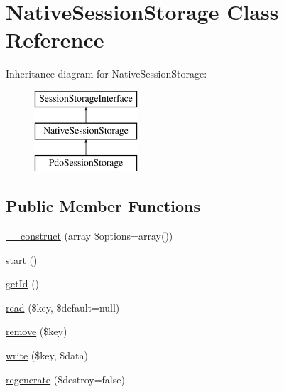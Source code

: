 \hypertarget{class_symfony_1_1_component_1_1_http_foundation_1_1_session_storage_1_1_native_session_storage}{
\section{\-Native\-Session\-Storage \-Class \-Reference}
\label{class_symfony_1_1_component_1_1_http_foundation_1_1_session_storage_1_1_native_session_storage}
}
\-Inheritance diagram for \-Native\-Session\-Storage\-:\begin{figure}[H]
\begin{center}
\leavevmode
\includegraphics[height=3.000000cm]{class_symfony_1_1_component_1_1_http_foundation_1_1_session_storage_1_1_native_session_storage}
\end{center}
\end{figure}
\subsection*{\-Public \-Member \-Functions}
\begin{DoxyCompactItemize}
\item 
\hyperlink{class_symfony_1_1_component_1_1_http_foundation_1_1_session_storage_1_1_native_session_storage_a2d2b2afcd896367c740d1eb4b486614b}{\-\_\-\-\_\-construct} (array \$options=array())
\item 
\hyperlink{class_symfony_1_1_component_1_1_http_foundation_1_1_session_storage_1_1_native_session_storage_af8fa59992209e36dccb3eefb0f75531f}{start} ()
\item 
\hyperlink{class_symfony_1_1_component_1_1_http_foundation_1_1_session_storage_1_1_native_session_storage_a12251d0c022e9e21c137a105ff683f13}{get\-Id} ()
\item 
\hyperlink{class_symfony_1_1_component_1_1_http_foundation_1_1_session_storage_1_1_native_session_storage_a975b0434ec898581f1d920e4ed1b3b79}{read} (\$key, \$default=null)
\item 
\hyperlink{class_symfony_1_1_component_1_1_http_foundation_1_1_session_storage_1_1_native_session_storage_a95483af4e2c07dc9893fe058b026bd5d}{remove} (\$key)
\item 
\hyperlink{class_symfony_1_1_component_1_1_http_foundation_1_1_session_storage_1_1_native_session_storage_a660fb10f6989d97867e2cd7d9107f864}{write} (\$key, \$data)
\item 
\hyperlink{class_symfony_1_1_component_1_1_http_foundation_1_1_session_storage_1_1_native_session_storage_a8a41caa79708db4e79d5d453e2cae6b1}{regenerate} (\$destroy=false)
\end{DoxyCompactItemize}
